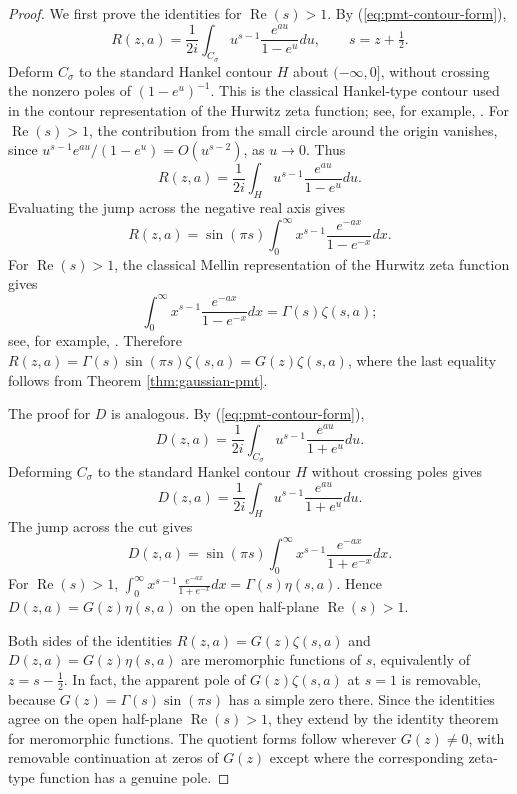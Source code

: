 \documentclass[12pt,english]{article}
\theoremstyle{plain} %
\theoremstyle{remark} %
\begin{document}
\begin{proof}
We first prove the identities for $\operatorname{Re}(s)>1$. By
(\ref{eq:pmt-contour-form}),
$$
R(z,a)
=
\frac{1}{2i}
\int_{C_\sigma}
u^{s-1}\frac{e^{au}}{1-e^u}du,
\qquad s=z+\tfrac{1}{2}.
$$
Deform $C_\sigma$ to the standard Hankel contour $H$ about $(-\infty,0]$, without crossing the nonzero poles of $(1-e^u)^{-1}$. This is the classical Hankel-type contour used in the contour representation of the Hurwitz zeta function; see, for example, \citet[Section 13.13, pp. 277--278]{WhittakerWatson:2021}.
For $\operatorname{Re}(s)>1$, the contribution from the small circle around the origin vanishes, since
$u^{s-1}e^{au}/(1-e^u) = O(u^{s-2})$, as $u\to0$. Thus
$$
R(z,a)
= \frac{1}{2i}
\int_H
u^{s-1}\frac{e^{au}}{1-e^u}du.
$$
Evaluating the jump across the negative real axis gives
$$
R(z,a) = \sin(\pi s) \int_0^\infty x^{s-1}\frac{e^{-ax}}{1-e^{-x}}dx.
$$
For $\operatorname{Re}(s)>1$, the classical Mellin representation of the
Hurwitz zeta function gives
$$
\int_0^\infty
x^{s-1}\frac{e^{-ax}}{1-e^{-x}}dx
=
\Gamma(s)\zeta(s,a);
$$
see, for example, \citet[Section 12.1]{Apostol:1976}. Therefore
$R(z,a)=\Gamma(s)\sin(\pi s)\zeta(s,a)
=G(z)\zeta(s,a)$,  where the last equality follows from Theorem \ref{thm:gaussian-pmt}.

The proof for $D$ is analogous. By (\ref{eq:pmt-contour-form}),
$$
D(z,a)
=
\frac{1}{2i}
\int_{C_\sigma}
u^{s-1}\frac{e^{au}}{1+e^u}du.
$$
Deforming $C_\sigma$ to the standard Hankel contour $H$ without crossing poles
gives
$$
D(z,a)
=
\frac{1}{2i}
\int_H
u^{s-1}\frac{e^{au}}{1+e^u}du.
$$
The jump across the cut gives
$$
D(z,a)
=
\sin(\pi s)
\int_0^\infty
x^{s-1}\frac{e^{-ax}}{1+e^{-x}}dx.
$$
For $\operatorname{Re}(s)>1$,
$\int_0^\infty
x^{s-1}\frac{e^{-ax}}{1+e^{-x}}dx
=\Gamma(s)\eta(s,a)$. 
Hence $D(z,a)=G(z)\eta(s,a)$ on the open half-plane $\operatorname{Re}(s)>1$.

Both sides of the identities
$R(z,a)=G(z)\zeta(s,a)$ and $D(z,a)=G(z)\eta(s,a)$ are meromorphic functions of $s$, equivalently of $z=s-\tfrac{1}{2}$. 
In fact, the apparent pole of $G(z)\zeta(s,a)$ at $s=1$ is removable, because $G(z)=\Gamma(s)\sin(\pi s)$ has a simple zero there. Since the identities agree on the open half-plane $\operatorname{Re}(s)>1$, they extend by the identity theorem for meromorphic functions. The quotient forms follow wherever
$G(z)\neq0$, with removable continuation at zeros of $G(z)$ except where the
corresponding zeta-type function has a genuine pole.
\end{proof}
\end{document}
